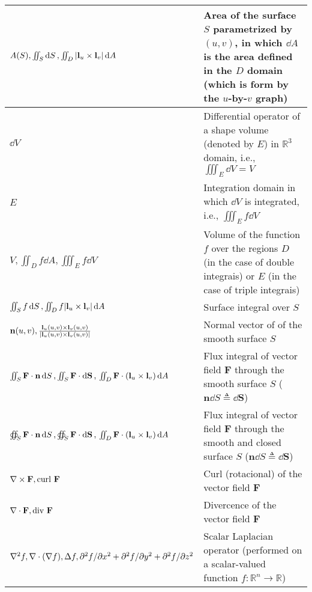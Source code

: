 \documentclass{article}
\begin{document}
\begin{xltabular}{\textwidth}{XX}
    \(A(S), \iint_S \dd{S}, \iint_D \abs{\mathbf{l}_u\times\mathbf{l}_v} \dd{A}\) & Area of the surface \(S\) parametrized by \((u,v)\), in which \(\dd{A}\) is the area defined in the \(D\) domain (which is form by the \(u\)-by-\(v\) graph)\\ \hline
    \(\dd{V}\) & Differential operator of a shape volume (denoted by \(E\)) in \(\mathbb{R}^3\) domain, i.e., \(\iiint_E \dd{V} = V\) \\ \hline
    \(E\) & Integration domain in which \(\dd{V}\) is integrated, i.e., \(\iiint_E f \dd{V}\) \cite{stewartCalculus2011} \\ \hline
    \(V, \iint_D f \dd{A}, \iiint_E f \dd{V}\) & Volume of the function \(f\) over the regions \(D\) (in the case of double integrais) or \(E\) (in the case of triple integrais) \\ \hline
    \(\iint_S f \dd{S}, \iint_D f \abs{\mathbf{l}_u\times\mathbf{l}_v} \dd{A}\)& Surface integral over \(S\) \\ \hline
    \(\mathbf{n}(u,v), \frac{\mathbf{l}_u(u,v)\times\mathbf{l}_v(u,v)}{\abs{\mathbf{l}_u(u,v)\times\mathbf{l}_v(u,v)}}\) & Normal vector of of the smooth surface \(S\) \\ \hline
    \(\iint_S \mathbf{F}\cdot \mathbf{n} \dd{S}, \iint_S \mathbf{F} \cdot \dd{\mathbf{S}}, \newline \iint_D \mathbf{F} \cdot (\mathbf{l}_u\times\mathbf{l}_v) \dd{A}\) & Flux integral of vector field \(\mathbf{F}\) through the smooth surface \(S\) (\(\mathbf{n} \dd{S} \triangleq \dd{\mathbf{S}}\)) \\ \hline
    \(\oiint_S \mathbf{F}\cdot \mathbf{n} \dd{S}, \oiint_S \mathbf{F} \cdot \dd{\mathbf{S}}, \newline \iint_D \mathbf{F} \cdot (\mathbf{l}_u\times\mathbf{l}_v) \dd{A}\) & Flux integral of vector field \(\mathbf{F}\) through the smooth and closed surface \(S\) (\(\mathbf{n} \dd{S} \triangleq \dd{\mathbf{S}}\)) \\ \hline
    \(\nabla \times \mathbf{F} , \textnormal{curl } \mathbf{F}\) & Curl (rotacional) of the vector field \(\mathbf{F}\)\\ \hline
    \(\nabla \cdot \mathbf{F} , \textnormal{div } \mathbf{F}\) & Divercence of the vector field \(\mathbf{F}\)\\ \hline
    \(\nabla^2 f, \nabla \cdot (\nabla f), \Delta f, \newline \partial^2f/\partial x^2 + \partial^2f/\partial y^2 + \partial^2f/\partial z^2\) & Scalar Laplacian operator (performed on a scalar-valued function \(f: \mathbb{R}^{n} \rightarrow \mathbb{R}\))\\ \hline

\end{xltabular}
\end{document}
